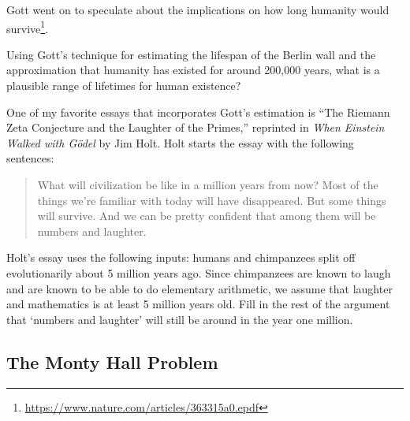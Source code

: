 Gott went on to speculate about the implications on how long humanity would survive\footnote{\url{https://www.nature.com/articles/363315a0.epdf}}.
\begin{exercise}
Using Gott's technique for estimating the lifespan of the Berlin wall and the approximation that humanity has existed for around 200,000 years, what is a plausible range of lifetimes for human existence?
\end{exercise}
One of my favorite essays that incorporates Gott's estimation is ``The Riemann Zeta Conjecture and the Laughter of the Primes,'' reprinted in \emph{When Einstein Walked with G\"odel} by Jim Holt. Holt starts the essay with the following sentences:
\begin{quote}
	What will civilization be like in a million years from now? Most of the things we're familiar with today will have disappeared. But some things will survive. And we can be pretty confident that among them will be numbers and laughter.
\end{quote}
\begin{exercise}
Holt's essay uses the following inputs: humans and chimpanzees split off evolutionarily about 5 million years ago. Since chimpanzees are known to laugh and are known to be able to do elementary arithmetic, we assume that laughter and mathematics is at least 5 million years old. Fill in the rest of the argument that `numbers and laughter' will still be around in the year one million.
\end{exercise}

\subsection{The Monty Hall Problem}

